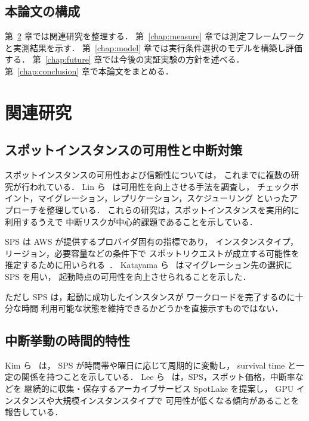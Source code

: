 \documentclass[11pt,a4paper]{ltjsreport}
\begin{document}
\section{本論文の構成}

第~\ref{chap:related} 章では関連研究を整理する．
第~\ref{chap:measure} 章では測定フレームワークと実測結果を示す．
第~\ref{chap:model} 章では実行条件選択のモデルを構築し評価する．
第~\ref{chap:future} 章では今後の実証実験の方針を述べる．
第~\ref{chap:conclusion} 章で本論文をまとめる．

\chapter{関連研究}
\label{chap:related}

\section{スポットインスタンスの可用性と中断対策}

スポットインスタンスの可用性および信頼性については，
これまでに複数の研究が行われている．
Lin ら~\cite{Lin2022Survey} は可用性を向上させる手法を調査し，
チェックポイント，マイグレーション，レプリケーション，スケジューリング
といったアプローチを整理している．
これらの研究は，スポットインスタンスを実用的に利用するうえで
中断リスクが中心的課題であることを示している．

SPS は AWS が提供するプロバイダ固有の指標であり，
インスタンスタイプ，リージョン，必要容量などの条件下で
スポットリクエストが成立する可能性を推定するために用いられる~\cite{AWSSPS}．
Katayama ら~\cite{Katayama2022} はマイグレーション先の選択に SPS を用い，
起動時点の可用性を向上させられることを示した．

ただし SPS は，起動に成功したインスタンスが
ワークロードを完了するのに十分な時間
利用可能な状態を維持できるかどうかを直接示すものではない．

\section{中断挙動の時間的特性}

Kim ら~\cite{Kim2024SpotInterruption} は，
SPS が時間帯や曜日に応じて周期的に変動し，
survival time と一定の関係を持つことを示している．
Lee ら~\cite{Lee2022SpotLake} は，SPS，スポット価格，中断率などを
継続的に収集・保存するアーカイブサービス SpotLake を提案し，
GPU インスタンスや大規模インスタンスタイプで
可用性が低くなる傾向があることを報告している．
\end{document}
